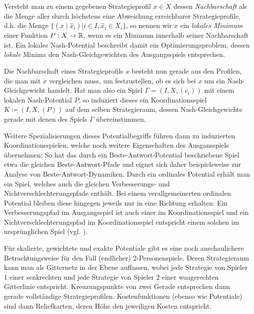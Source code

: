 Versteht man zu einem gegebenen Strategieprofil $x \in X$ dessen \emph{Nachbarschaft} als die Menge aller durch höchstens eine Abweichung erreichbarer Strategieprofile, d.h. die Menge $\{(x \mid \hat{x}_i) | i \in I, \hat{x}_i \in X_i\}$, so nennen wir $x$ ein \emph{lokales Minimum} einer Funktion $P: X \to \mathbb{R}$, wenn es ein Minimum innerhalb seiner Nachbarschaft ist. Ein lokales Nash-Potential beschreibt damit ein Optimierungsproblem, dessen \emph{lokale} Minima den Nash-Gleichgewichten des Ausgangsspiels entsprechen.

Die Nachbarschaft eines Strategieprofils $x$ besteht nun gerade aus den Profilen, die man mit $x$ vergleichen muss, um festzustellen, ob es sich bei $x$ um ein Nash-Gleichgewicht handelt. Hat man also ein Spiel $\Gamma = (I, X, (c_i))$ mit einem lokalen Nash-Potential $P$, so induziert dieses ein Koordinationsspiel $K \coloneqq (I, X, (P))$ auf dem selben Strategieraum, dessen Nash-Gleichgewichte gerade mit denen des Spiels $\Gamma$ übereinstimmen.

Weitere Spezialisierungen dieses Potentialbegriffs führen dann zu induzierten Koordinationsspielen, welche noch weitere Eigenschaften des Ausgansspiels übernehmen: So hat das durch ein Beste-Antwort-Potential beschriebene Spiel etwa die gleichen Beste-Antwort-Pfade und eignet sich daher beispielsweise zur Analyse von Beste-Antwort-Dynamiken. Durch ein ordinales Potential erhält man ein Spiel, welches auch die gleichen Verbesserungs- und Nichtverschlechterungspfade enthält. Bei einem verallgemeinerten ordinalen Potential bleiben diese hingegen jeweils nur in eine Richtung erhalten: Ein Verbesserungspfad im Ausgangsspiel ist auch einer im Koordinationsspiel und ein Nichtverschlechterungspfad im Koordinationsspiel entspricht einem solchen im ursprünglichen Spiel (vgl. ).

Für skalierte, gewichtete und exakte Potentiale gibt es eine noch anschaulichere Betrachtungsweise für den Fall (endlicher) 2-Personenspiele. Deren Strategieraum kann man als Gitternetz in der Ebene auffassen, wobei jede Strategie von Spieler 1 einer senkrechten und jede Strategie von Spieler 2 einer waagerechten Gitterlinie entspricht. Kreuzungspunkte von zwei Gerade entsprechen dann gerade vollständige Strategieprofilen. Kostenfunktionen (ebenso wie Potentiale) sind dann \glqq Reliefkarten\grqq{}, deren Höhe den jeweiligen Kosten entspricht. 


